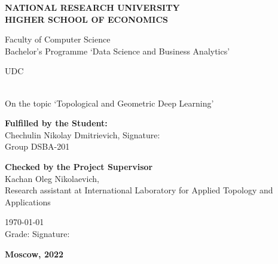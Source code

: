 %
%

\begin{titlepage}
	\begin{center}
		\textbf{\MakeUppercase{National Research University\\ Higher School of Economics}}

		\vspace*{1cm}

		Faculty of Computer Science\\
		Bachelor's Programme `Data Science and Business Analytics'
	\end{center}

	UDC \underbar{\hspace{3cm}}

	\vspace*{1.5cm}

	\\
	On the topic `Topological and Geometric Deep Learning'

	\vspace*{2cm}

	\begin{flushleft}
		\textbf{Fulfilled by the Student:}\\
		Chechulin Nikolay Dmitrievich, Signature: \underbar{\hspace{3cm}}\\
		Group DSBA-201

		\vspace*{1cm}

		\textbf{Checked by the Project Supervisor}\\
		Kachan Oleg Nikolaevich,\\
		Research assistant at International Laboratory for Applied Topology and Applications

		\today \hspace*{1cm}\\
		Grade: \underbar{\hspace{1.5cm}} \hspace*{1cm}
		Signature: \underbar{\hspace{3cm}}

	\end{flushleft}

	\vfill
	\textbf{Moscow, 2022}
\end{titlepage}
